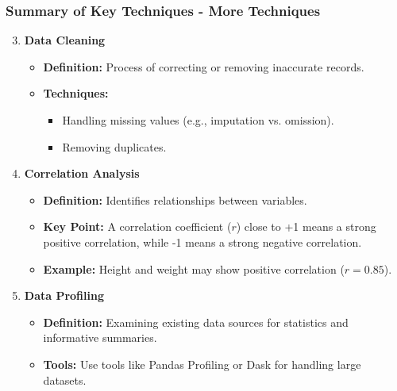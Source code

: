 \documentclass[aspectratio=169]{beamer}
\begin{document}
\begin{frame}[fragile]
    \frametitle{Summary of Key Techniques - More Techniques}
    \begin{enumerate}
        \setcounter{enumi}{2} %
        \item \textbf{Data Cleaning}
            \begin{itemize}
                \item \textbf{Definition:} Process of correcting or removing inaccurate records.
                \item \textbf{Techniques:} 
                \begin{itemize}
                    \item Handling missing values (e.g., imputation vs. omission).
                    \item Removing duplicates.
                \end{itemize}
            \end{itemize}

        \item \textbf{Correlation Analysis}
            \begin{itemize}
                \item \textbf{Definition:} Identifies relationships between variables.
                \item \textbf{Key Point:} A correlation coefficient (\( r \)) close to +1 means a strong positive correlation, while -1 means a strong negative correlation.
                \item \textbf{Example:} Height and weight may show positive correlation (\( r = 0.85 \)).
            \end{itemize}
        
        \item \textbf{Data Profiling}
            \begin{itemize}
                \item \textbf{Definition:} Examining existing data sources for statistics and informative summaries.
                \item \textbf{Tools:} Use tools like Pandas Profiling or Dask for handling large datasets.
            \end{itemize}
    \end{enumerate}
\end{frame}
\end{document}
